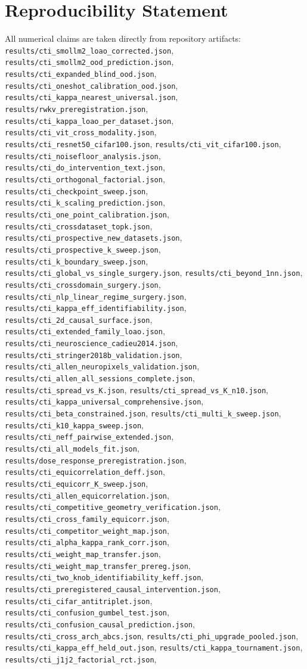 \documentclass{article}
\begin{document}
\section*{Reproducibility Statement}
All numerical claims are taken directly from repository artifacts: \texttt{results/cti\_smollm2\_loao\_corrected.json}, \texttt{results/cti\_smollm2\_ood\_prediction.json}, \texttt{results/cti\_expanded\_blind\_ood.json}, \texttt{results/cti\_oneshot\_calibration\_ood.json}, \texttt{results/cti\_kappa\_nearest\_universal.json}, \texttt{results/rwkv\_preregistration.json}, \texttt{results/cti\_kappa\_loao\_per\_dataset.json}, \texttt{results/cti\_vit\_cross\_modality.json}, \texttt{results/cti\_resnet50\_cifar100.json}, \texttt{results/cti\_vit\_cifar100.json}, \texttt{results/cti\_noisefloor\_analysis.json}, \texttt{results/cti\_do\_intervention\_text.json}, \texttt{results/cti\_orthogonal\_factorial.json}, \texttt{results/cti\_checkpoint\_sweep.json}, \texttt{results/cti\_k\_scaling\_prediction.json}, \texttt{results/cti\_one\_point\_calibration.json}, \texttt{results/cti\_crossdataset\_topk.json}, \texttt{results/cti\_prospective\_new\_datasets.json}, \texttt{results/cti\_prospective\_k\_sweep.json}, \texttt{results/cti\_k\_boundary\_sweep.json}, \texttt{results/cti\_global\_vs\_single\_surgery.json}, \texttt{results/cti\_beyond\_1nn.json}, \texttt{results/cti\_crossdomain\_surgery.json}, \texttt{results/cti\_nlp\_linear\_regime\_surgery.json}, \texttt{results/cti\_kappa\_eff\_identifiability.json}, \texttt{results/cti\_2d\_causal\_surface.json}, \texttt{results/cti\_extended\_family\_loao.json}, \texttt{results/cti\_neuroscience\_cadieu2014.json}, \texttt{results/cti\_stringer2018b\_validation.json}, \texttt{results/cti\_allen\_neuropixels\_validation.json}, \texttt{results/cti\_allen\_all\_sessions\_complete.json}, \texttt{results/cti\_spread\_vs\_K.json}, \texttt{results/cti\_spread\_vs\_K\_n10.json}, \texttt{results/cti\_kappa\_universal\_comprehensive.json}, \texttt{results/cti\_beta\_constrained.json}, \texttt{results/cti\_multi\_k\_sweep.json}, \texttt{results/cti\_k10\_kappa\_sweep.json}, \texttt{results/cti\_neff\_pairwise\_extended.json}, \texttt{results/cti\_all\_models\_fit.json}, \texttt{results/dose\_response\_preregistration.json}, \texttt{results/cti\_equicorrelation\_deff.json}, \texttt{results/cti\_equicorr\_K\_sweep.json}, \texttt{results/cti\_allen\_equicorrelation.json}, \texttt{results/cti\_competitive\_geometry\_verification.json}, \texttt{results/cti\_cross\_family\_equicorr.json}, \texttt{results/cti\_competitor\_weight\_map.json}, \texttt{results/cti\_alpha\_kappa\_rank\_corr.json}, \texttt{results/cti\_weight\_map\_transfer.json}, \texttt{results/cti\_weight\_map\_transfer\_prereg.json}, \texttt{results/cti\_two\_knob\_identifiability\_keff.json}, \texttt{results/cti\_preregistered\_causal\_intervention.json}, \texttt{results/cti\_cifar\_antitriplet.json}, \texttt{results/cti\_confusion\_gumbel\_test.json}, \texttt{results/cti\_confusion\_causal\_prediction.json}, \texttt{results/cti\_cross\_arch\_abcs.json}, \texttt{results/cti\_phi\_upgrade\_pooled.json}, \texttt{results/cti\_kappa\_eff\_held\_out.json}, \texttt{results/cti\_kappa\_tournament.json}, \texttt{results/cti\_j1j2\_factorial\_rct.json}, 
\end{document}
